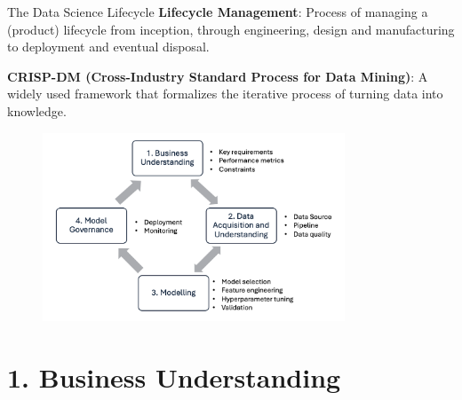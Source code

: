 \documentclass[10pt,compress,t,notes=noshow, xcolor=table]{beamer}
\begin{document}
\begin{frame}{The Data Science Lifecycle }
\label{the-data-science-lifecycle-1}
\textbf{Lifecycle Management}: Process of managing a (product) lifecycle from inception, through engineering, design and manufacturing to deployment and eventual disposal.

\textbf{CRISP-DM (Cross-Industry Standard Process for Data Mining)}:
A widely used framework that formalizes the iterative process of turning data into knowledge. 




\begin{figure}[h]
\includegraphics[width=9cm]{figure_man/DSLifecycle2.png}
\end{figure}

\end{frame}


\section{1. Business Understanding}\label{business-understanding-1}
\end{document}
